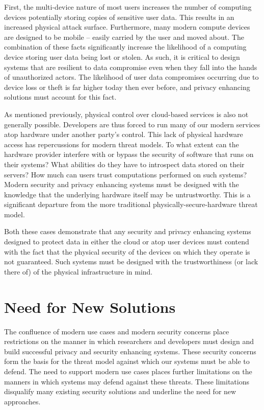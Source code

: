 First, the multi-device nature of most users increases the number of
computing devices potentially storing copies of sensitive user
data. This results in an increased physical attack surface.
Furthermore, many modern compute devices are designed to be mobile --
easily carried by the user and moved about. The combination of these
facts significantly increase the likelihood of a computing device
storing user data being lost or stolen. As such, it is critical to
design systems that are resilient to data compromise even when they
fall into the hands of unauthorized actors. The likelihood of user
data compromises occurring due to device loss or theft is far higher
today then ever before, and privacy enhancing solutions must account
for this fact.

As mentioned previously, physical control over cloud-based services is
also not generally possible. Developers are thus forced to run many of
our modern services atop hardware under another party's control. This
lack of physical hardware access has repercussions for modern threat
models. To what extent can the hardware provider interfere with or
bypass the security of software that runs on their systems? What
abilities do they have to introspect data stored on their servers? How
much can users trust computations performed on such systems?  Modern
security and privacy enhancing systems must be designed with the
knowledge that the underlying hardware itself may be
untrustworthy. This is a significant departure from the more
traditional physically-secure-hardware threat model.

Both these cases demonstrate that any security and privacy enhancing
systems designed to protect data in either the cloud or atop user
devices must contend with the fact that the physical security of the
devices on which they operate is not guaranteed. Such systems must be
designed with the trustworthiness (or lack there of) of the physical
infrastructure in mind.

\section{Need for New Solutions}
\label{chap:challenges:solutions}

The confluence of modern use cases and modern security concerns place
restrictions on the manner in which researchers and developers must
design and build successful privacy and security enhancing
systems. These security concerns form the basis for the threat model
against which our systems must be able to defend. The need to support
modern use cases places further limitations on the manners in which
systems may defend against these threats. These limitations disqualify
many existing security solutions and underline the need for new
approaches.

